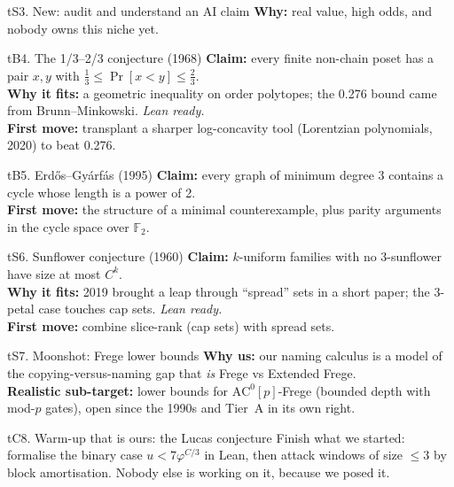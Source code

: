 \documentclass[10pt,a4paper]{article}
\begin{document}
\begin{tcbraster}[raster columns=2,raster equal height=rows,raster column skip=8pt,raster row skip=8pt]
\begin{card}{tS}{3. New: audit and understand an AI claim}
\textbf{Why:} real value, high odds, and nobody owns this niche yet.
\end{card}
\begin{card}{tB}{4. The 1/3--2/3 conjecture (1968)}
\textbf{Claim:} every finite non-chain poset has a pair $x,y$ with $\tfrac13\le\Pr[x<y]\le\tfrac23$.\\
\textbf{Why it fits:} a geometric inequality on order polytopes; the 0.276 bound came from Brunn--Minkowski. \emph{Lean ready.}\\
\textbf{First move:} transplant a sharper log-concavity tool (Lorentzian polynomials, 2020) to beat 0.276.
\end{card}
\begin{card}{tB}{5. Erd\H{o}s--Gy\'arf\'as (1995)}
\textbf{Claim:} every graph of minimum degree 3 contains a cycle whose length is a power of 2.\\
\textbf{First move:} the structure of a minimal counterexample, plus parity arguments in the cycle space over $\mathbb F_2$.
\end{card}
\begin{card}{tS}{6. Sunflower conjecture (1960)}
\textbf{Claim:} $k$-uniform families with no 3-sunflower have size at most $C^k$.\\
\textbf{Why it fits:} 2019 brought a leap through ``spread'' sets in a short paper; the 3-petal case touches cap sets. \emph{Lean ready.}\\
\textbf{First move:} combine slice-rank (cap sets) with spread sets.
\end{card}
\begin{card}{tS}{7. Moonshot: Frege lower bounds}
\textbf{Why us:} our naming calculus is a model of the copying-versus-naming gap that \emph{is} Frege vs Extended Frege.\\
\textbf{Realistic sub-target:} lower bounds for $\mathrm{AC}^0[p]$-Frege (bounded depth with mod-$p$ gates), open since the 1990s and Tier~A in its own right.
\end{card}
\begin{card}{tC}{8. Warm-up that is ours: the Lucas conjecture}
Finish what we started: formalise the binary case $u<7\varphi^{C/3}$ in Lean, then attack windows of size
$\le3$ by block amortisation. Nobody else is working on it, because we posed it.
\end{card}
\end{tcbraster}
\end{document}
